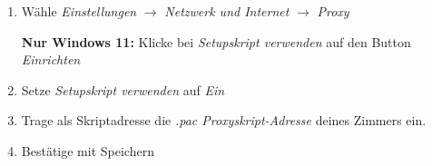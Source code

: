 \documentclass[a4paper,12pt]{scrartcl}
\begin{document}
\begin{enumerate}
	\item Wähle \textit{Einstellungen} $\rightarrow$ \textit{Netzwerk und Internet} $\rightarrow$ \textit{Proxy}
	
	
	\subitem \textbf{Nur Windows 11:} Klicke bei \textit{Setupskript verwenden} auf den Button  \textit{Einrichten}
	
	\setcounter{enumi}{1}
	\item Setze \textit{Setupskript verwenden} auf \textit{Ein}
	\item Trage als Skriptadresse die \textit{.pac Proxyskript-Adresse} deines Zimmers ein.
	\item Bestätige mit Speichern
\end{enumerate}
\end{document}
